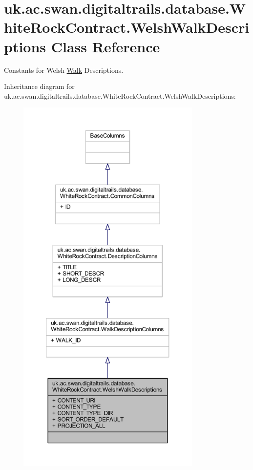 \hypertarget{classuk_1_1ac_1_1swan_1_1digitaltrails_1_1database_1_1_white_rock_contract_1_1_welsh_walk_descriptions}{\section{uk.\+ac.\+swan.\+digitaltrails.\+database.\+White\+Rock\+Contract.\+Welsh\+Walk\+Descriptions Class Reference}
\label{classuk_1_1ac_1_1swan_1_1digitaltrails_1_1database_1_1_white_rock_contract_1_1_welsh_walk_descriptions}
}


Constants for Welsh \hyperlink{classuk_1_1ac_1_1swan_1_1digitaltrails_1_1database_1_1_white_rock_contract_1_1_walk}{Walk} Descriptions.  




Inheritance diagram for uk.\+ac.\+swan.\+digitaltrails.\+database.\+White\+Rock\+Contract.\+Welsh\+Walk\+Descriptions\+:
\nopagebreak
\begin{figure}[H]
\begin{center}
\leavevmode
\includegraphics[height=550pt]{classuk_1_1ac_1_1swan_1_1digitaltrails_1_1database_1_1_white_rock_contract_1_1_welsh_walk_descriptions__inherit__graph}
\end{center}
\end{figure}


